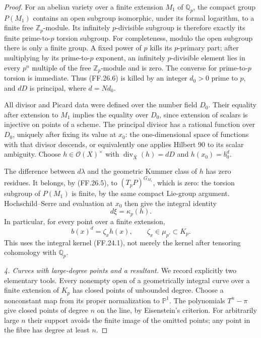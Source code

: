 \begin{proof}
For an abelian variety over a finite extension \(M_1\)
of \(\mathbb Q_p\), the compact group \(P(M_1)\)
contains an open subgroup isomorphic, under its formal
logarithm, to a finite free \(\mathbb Z_p\)-module.
Its infinitely \(p\)-divisible subgroup is therefore
exactly its finite prime-to-\(p\) torsion subgroup.
For completeness, modulo the open subgroup there is
only a finite group. A fixed power of \(p\) kills
its \(p\)-primary part; after multiplying by its
prime-to-\(p\) exponent, an infinitely \(p\)-divisible
element lies in every \(p^n\) multiple of the free
\(\mathbb Z_p\)-module and is zero. The converse for
prime-to-\(p\) torsion is immediate.
Thus (FF.26.6) is killed by an integer \(d_0>0\)
prime to \(p\), and \(dD\) is principal, where
\(d=Nd_0\).

All divisor and Picard data were defined over the
number field \(D_0\). Their equality after extension
to \(M_1\) implies the equality over \(D_0\), since
extension of scalars is injective on points of a scheme.
The principal divisor has a rational function over
\(D_0\), uniquely after fixing its value at \(x_0\):
the one-dimensional space of functions with that divisor
descends, or equivalently one applies Hilbert 90 to its
scalar ambiguity. Choose
\(h\in\mathcal O(X)^\times\) with
\(\operatorname{div}_{\bar X}(h)=dD\) and
\(h(x_0)=b_0^d\).

The difference between \(d\lambda\) and the geometric
Kummer class of \(h\) has zero residues. It belongs,
by (FF.26.5), to \((T_pP)^{G_{M_1}}\), which is zero:
the torsion subgroup of \(P(M_1)\) is finite, by
the same compact Lie-group argument. Hochschild--Serre
and evaluation at \(x_0\) then give the integral identity
\[
                         d\xi=\kappa_p(h).              \tag{FF.26.7}
\]
In particular, for every point over a finite extension,
\[
                         b(x)^d=\zeta_xh(x),
                         \qquad\zeta_x\in\mu_{p'}\subset K_p.
                                                               \tag{FF.26.8}
\]
This uses the integral kernel (FF.24.1), not merely
the kernel after tensoring cohomology with \(\mathbb Q_p\).

\emph{4. Curves with large-degree points and a resultant.}
We record explicitly two elementary tools. Every nonempty
open of a geometrically integral curve over a finite
extension of \(K_p\) has closed points of unbounded
degree. Choose a nonconstant map from its proper
normalization to \(\mathbb P^1\). The polynomials
\(T^n-\pi\) give closed points of degree \(n\) on
the line, by Eisenstein's criterion. For arbitrarily
large \(n\) their support avoids the finite image
of the omitted points; any point in the fibre has
degree at least \(n\).


\end{proof}
